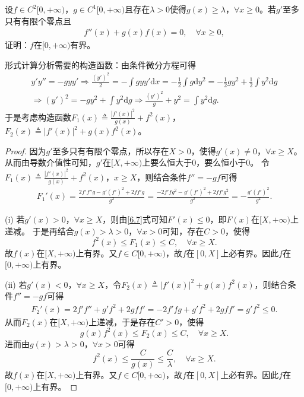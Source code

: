 \documentclass[../../main.tex]{subfiles}
\begin{document}
\begin{example}
设\(f \in C^{2}[0, +\infty)\)，\(g \in C^{1}[0, +\infty)\)且存在\(\lambda > 0\)使得\(g(x) \geqslant \lambda\)，\(\forall x \geqslant 0\)。若\(g'\)至多只有有限个零点且
\begin{align*}
f''(x)+g(x)f(x) = 0,\quad\forall x \geqslant 0,
\end{align*}
证明：\(f\)在\([0, +\infty)\)有界。
\end{example}
\begin{note}
形式计算分析需要的构造函数：由条件微分方程可得
\begin{align*}
y'y'' =-gyy' \Rightarrow \frac{( y' )^2}{2}=-\int{gyy'\mathrm{d}x}=-\frac{1}{2}\int{g\mathrm{d}y^2}=-\frac{1}{2}gy^2+\frac{1}{2}\int{y^2\mathrm{d}g}
\\
\Rightarrow ( y' )^2=-gy^2+\int{y^2\mathrm{d}g}\Rightarrow \frac{( y' )^2}{g}+y^2=\int{y^2\mathrm{d}g}.
\end{align*}
于是考虑构造函数\(F_1( x ) \triangleq \frac{| f'( x ) |^2}{g( x )}+f^2( x )\)，\(F_2( x ) \triangleq | f'( x ) |^2+g( x ) f^2( x )\)。
\end{note}
\begin{proof}
因为\(g'\)至多只有有限个零点，所以存在\(X>0\)，使得\(g'( x ) \ne 0\)，\(\forall x\geqslant X\)。从而由导数介值性可知，\(g'\)在\([ X,+\infty )\)上要么恒大于\(0\)，要么恒小于\(0\)。
令\(F_1( x ) \triangleq \frac{| f'( x ) |^2}{g( x )}+f^2( x )\)，\(x\geqslant X\)，则结合条件\(f'' =-gf\)可得
\begin{align}
F_{1}'( x ) =\frac{2f'f'' g-g'( f' )^2+2ff' g}{g^2}=\frac{-2f'fg^2-g'( f' )^2+2ff'g^2}{g^2}=-\frac{g'( f' )^2}{g^2}. \label{6.7}
\end{align}

(i) 若\(g'( x ) >0\)，\(\forall x\geqslant X\)，则由\eqref{6.7}式可知\(F'( x ) \leqslant 0\)，即\(F( x )\)在\([ X,+\infty )\)上递减。
于是再结合\(g( x ) >\lambda >0\)，\(\forall x>0\)可知，存在\(C>0\)，使得
\[
f^2( x ) \leqslant F_1( x ) \leqslant C,\quad\forall x\geqslant X.
\]
故\(f( x )\)在\([ X,+\infty )\)上有界。又\(f\in C[ 0,+\infty )\)，故\(f\)在\([ 0,X ]\)上必有界。因此\(f\)在\([ 0,+\infty )\)上有界。

(ii) 若\(g'( x ) <0\)，\(\forall x\geqslant X\)，令\(F_2( x ) \triangleq | f'( x ) |^2+g( x ) f^2( x )\)，则结合条件\(f'' =-gf\)可得
\begin{align}
F_{2}'( x ) =2f'f'' +g'f^2+2gff' =-2f'fg+g'f^2+2gff' =g'f^2\leqslant 0. \label{6.8}
\end{align}
从而\(F_2( x )\)在\([ X,+\infty )\)上递减，于是存在\(C'>0\)，使得
\[
g( x ) f^2( x ) \leqslant F_2( x ) \leqslant C,\quad\forall x\geqslant X.
\]
进而由\(g( x ) >\lambda >0\)，\(\forall x>0\)可得
\[
f^2( x ) \leqslant \frac{C}{g( x )}\leqslant \frac{C}{\lambda},\quad\forall x\geqslant X.
\]
故\(f( x )\)在\([ X,+\infty )\)上有界。又\(f\in C[ 0,+\infty )\)，故\(f\)在\([ 0,X ]\)上必有界。因此\(f\)在\([ 0,+\infty )\)上有界。

\end{proof}
\end{document}

